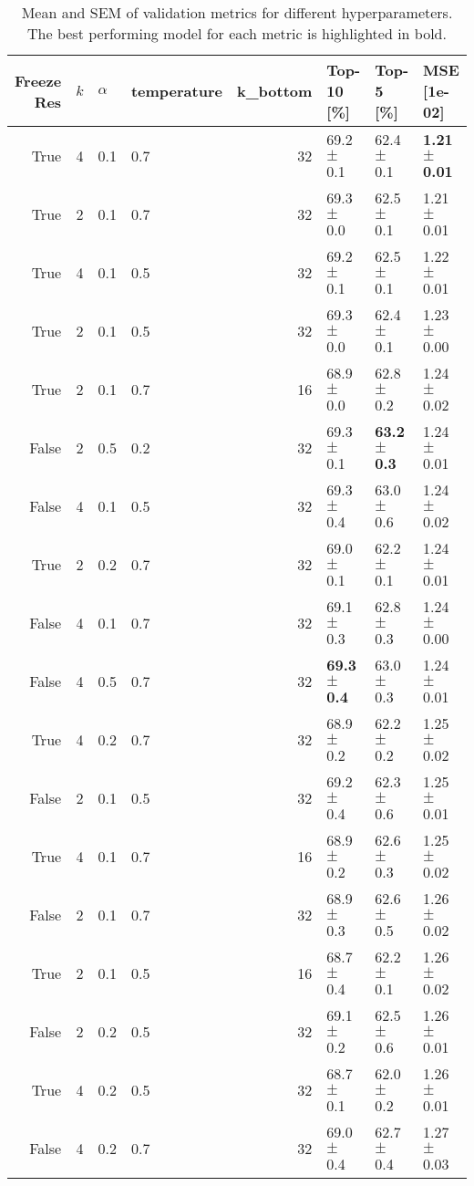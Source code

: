 \begin{table}[h]
\caption{Mean and SEM of validation metrics for different hyperparameters. The best performing model for each metric is highlighted in bold.}
\label{tab:tmp}
\begin{tabular}{rrllrlll}
\toprule
Freeze Res & $k$ & $\alpha$ & temperature & k_bottom & Top-10 [\%] & Top-5 [\%] & MSE [1e-02] \\
\midrule
True & 4 & 0.1 & 0.7 & 32 & 69.2 $\pm$ 0.1 & 62.4 $\pm$ 0.1 & \textbf{1.21 $\pm$ 0.01} \\
True & 2 & 0.1 & 0.7 & 32 & 69.3 $\pm$ 0.0 & 62.5 $\pm$ 0.1 & 1.21 $\pm$ 0.01 \\
True & 4 & 0.1 & 0.5 & 32 & 69.2 $\pm$ 0.1 & 62.5 $\pm$ 0.1 & 1.22 $\pm$ 0.01 \\
True & 2 & 0.1 & 0.5 & 32 & 69.3 $\pm$ 0.0 & 62.4 $\pm$ 0.1 & 1.23 $\pm$ 0.00 \\
True & 2 & 0.1 & 0.7 & 16 & 68.9 $\pm$ 0.0 & 62.8 $\pm$ 0.2 & 1.24 $\pm$ 0.02 \\
False & 2 & 0.5 & 0.2 & 32 & 69.3 $\pm$ 0.1 & \textbf{63.2 $\pm$ 0.3} & 1.24 $\pm$ 0.01 \\
False & 4 & 0.1 & 0.5 & 32 & 69.3 $\pm$ 0.4 & 63.0 $\pm$ 0.6 & 1.24 $\pm$ 0.02 \\
True & 2 & 0.2 & 0.7 & 32 & 69.0 $\pm$ 0.1 & 62.2 $\pm$ 0.1 & 1.24 $\pm$ 0.01 \\
False & 4 & 0.1 & 0.7 & 32 & 69.1 $\pm$ 0.3 & 62.8 $\pm$ 0.3 & 1.24 $\pm$ 0.00 \\
False & 4 & 0.5 & 0.7 & 32 & \textbf{69.3 $\pm$ 0.4} & 63.0 $\pm$ 0.3 & 1.24 $\pm$ 0.01 \\
True & 4 & 0.2 & 0.7 & 32 & 68.9 $\pm$ 0.2 & 62.2 $\pm$ 0.2 & 1.25 $\pm$ 0.02 \\
False & 2 & 0.1 & 0.5 & 32 & 69.2 $\pm$ 0.4 & 62.3 $\pm$ 0.6 & 1.25 $\pm$ 0.01 \\
True & 4 & 0.1 & 0.7 & 16 & 68.9 $\pm$ 0.2 & 62.6 $\pm$ 0.3 & 1.25 $\pm$ 0.02 \\
False & 2 & 0.1 & 0.7 & 32 & 68.9 $\pm$ 0.3 & 62.6 $\pm$ 0.5 & 1.26 $\pm$ 0.02 \\
True & 2 & 0.1 & 0.5 & 16 & 68.7 $\pm$ 0.4 & 62.2 $\pm$ 0.1 & 1.26 $\pm$ 0.02 \\
False & 2 & 0.2 & 0.5 & 32 & 69.1 $\pm$ 0.2 & 62.5 $\pm$ 0.6 & 1.26 $\pm$ 0.01 \\
True & 4 & 0.2 & 0.5 & 32 & 68.7 $\pm$ 0.1 & 62.0 $\pm$ 0.2 & 1.26 $\pm$ 0.01 \\
False & 4 & 0.2 & 0.7 & 32 & 69.0 $\pm$ 0.4 & 62.7 $\pm$ 0.4 & 1.27 $\pm$ 0.03 \\

\end{tabular}
\end{table}
